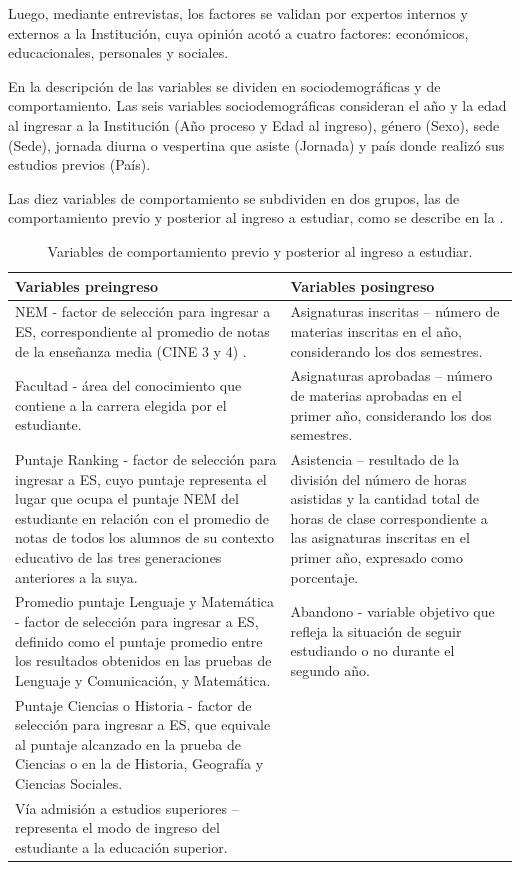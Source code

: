 \documentclass[portuguese]{textolivre}
\begin{document}
Luego, mediante entrevistas, los factores se validan por expertos internos y externos a la Institución, cuya opinión acotó a cuatro factores: económicos, educacionales, personales y sociales.

En la descripción de las variables se dividen en sociodemográficas y de comportamiento. Las seis variables sociodemográficas consideran el año y la edad al ingresar a la Institución (Año proceso y Edad al ingreso), género (Sexo), sede (Sede), jornada diurna o vespertina que asiste (Jornada) y país donde realizó sus estudios previos (País).

Las diez variables de comportamiento se subdividen en dos grupos, las de comportamiento previo y posterior al ingreso a estudiar, como se describe en la .

\begin{table}[htpb]
  \caption{Variables de comportamiento previo y posterior al ingreso a estudiar.}
  \label{Tabla 3}
  \centering
  \begin{tabular}{p{}p{}}
  \toprule
  Variables preingreso & Variables posingreso\\
  \midrule
  NEM - factor de selección para ingresar a ES, correspondiente al promedio de notas de la enseñanza media (CINE 3 y 4) \cite{UNESCOInstituteforStatistics2012}. & Asignaturas inscritas – número de materias inscritas en el año, considerando los dos semestres.\\
  \cmidrule{1-2}
  Facultad - área del conocimiento que contiene a la carrera elegida por el estudiante. & Asignaturas aprobadas – número de materias aprobadas en el primer año, considerando los dos semestres.\\
  \cmidrule{1-2}
  Puntaje Ranking - factor de selección para ingresar a ES, cuyo puntaje representa el lugar que ocupa el puntaje NEM del estudiante en relación con el promedio de notas de todos los alumnos de su contexto educativo de las tres generaciones anteriores a la suya. & Asistencia – resultado de la división del número de horas asistidas y la cantidad total de horas de clase correspondiente a las asignaturas inscritas en el primer año, expresado como porcentaje.\\
  \cmidrule{1-2}
  Promedio puntaje Lenguaje y Matemática - factor de selección para ingresar a ES, definido como el puntaje promedio entre los resultados obtenidos en las pruebas de Lenguaje y Comunicación, y Matemática. & Abandono - variable objetivo que refleja la situación de seguir estudiando o no durante el segundo año.\\
  \cmidrule{1-2}
  Puntaje Ciencias o Historia - factor de selección para ingresar a ES, que equivale al puntaje alcanzado en la prueba de Ciencias o en la de Historia, Geografía y Ciencias Sociales. & \\
  \cmidrule{1-2}
  Vía admisión a estudios superiores – representa el modo de ingreso del estudiante a la educación superior. & \\
  \bottomrule
  \end{tabular}
\end{table}
\end{document}
